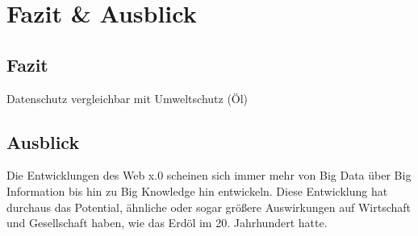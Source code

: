 \section{Fazit \& Ausblick}

\subsection{Fazit}

Datenschutz vergleichbar mit Umweltschutz (Öl)

\subsection{Ausblick}

Die Entwicklungen des Web x.0 scheinen sich immer mehr von Big Data über Big Information bis hin zu Big Knowledge hin entwickeln. Diese Entwicklung hat durchaus das Potential, ähnliche oder sogar größere Auswirkungen auf Wirtschaft und Gesellschaft haben, wie das Erdöl im 20. Jahrhundert hatte.
